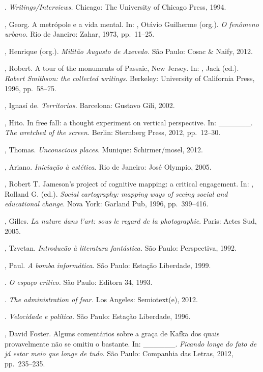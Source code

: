 \begin{bibliohedra}
\tit{\_\_\_\_\_\_}. \emph{Writings/Interviews.} Chicago: The University
of Chicago Press, 1994.

, Georg. A metrópole e a vida mental. In: , Otávio Guilherme
(org.). \emph{O fenômeno urbano.} Rio de Janeiro: Zahar, 1973, pp.~11--25.

, Henrique (org.). \emph{Militão Augusto de Azevedo.} São
Paulo: Cosac \& Naify, 2012.

, Robert. A tour of the monuments of Passaic, New Jersey. In:
, Jack (ed.). \emph{Robert Smithson: the collected writings}.
Berkeley: University of California Press, 1996, pp.~58--75.

, Ignasí de. \emph{Territorios.} Barcelona: Gustavo Gili,
2002.

, Hito. In free fall: a thought experiment on vertical
perspective. In: \_\_\_\_\_\_. \emph{The wretched of the screen.}
Berlin: Sternberg Press, 2012, pp.~12--30.

, Thomas. \emph{Unconscious places.} Munique: Schirmer/mosel, 2012.

, Ariano. \emph{Iniciação à estética.} Rio de Janeiro: José
Olympio, 2005.

, Robert T. Jameson's project of cognitive mapping: a critical
engagement. In: , Rolland G. (ed.). \emph{Social cartography:
mapping ways of seeing social and educational change}. Nova York: Garland
Pub, 1996, pp.~399--416.

, Gilles. \emph{La nature dans l'art: sous le regard de la
photographie}. Paris: Actes Sud, 2005.

, Tzvetan. \emph{Introducão à literatura fantástica.} São
Paulo: Perspectiva, 1992.

, Paul. \emph{A bomba informática.} São Paulo: Estação
Liberdade, 1999.

\tit{\_\_\_\_\_\_}. \emph{O espaço crítico.} São Paulo: Editora 34, 1993.

\tit{\_\_\_\_\_\_}. \emph{The administration of fear.} Los Angeles: Semiotext(e), 2012.

\tit{\_\_\_\_\_\_}. \emph{Velocidade e política.} São Paulo: Estação
Liberdade, 1996.

, David Foster. Alguns comentários sobre a graça de Kafka dos
quais provavelmente não se omitiu o bastante. In: \_\_\_\_\_\_.
\emph{Ficando longe do fato de já estar meio que longe de tudo}. São
Paulo: Companhia das Letras, 2012, pp.~235--235.


\end{bibliohedra}

